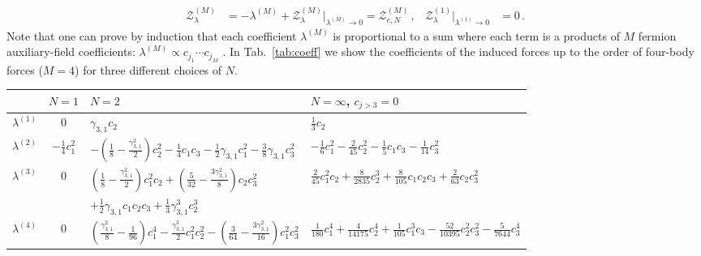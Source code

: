 \documentclass[aps,prl,twocolumn,showpacs,superscriptaddress,groupedaddress, final, nofootinbib]{revtex4}  %
\newcommand{\Z}{\ensuremath{\mathcal{Z}}}
\newcommand{\g}{\ensuremath{\gamma}}
\newcommand{\oneby}[1]{\frac{1}{#1}}
\begin{document}
{\small
\begin{align}
	\Z^{(M)}_{\lambda}
	&=
	-\lambda^{(M)} 
	+
	\Z^{(M)}_{\lambda}\big|_{\lambda^{(M)}\to 0}
	=
	\Z^{(M)}_{c,N}
	\, ,
	&
	\Z^{(1)}_{\lambda}\big|_{\lambda^{(1)}\to 0}
	&=
	0
	\, .
\end{align}}
Note that one can prove by induction that each coefficient $\lambda^{(M)}$ is proportional to a sum where each term is a products of $M$ fermion auxiliary-field coefficients: $\lambda^{(M)} \propto c_{j_1} \cdots c_{j_M}$ \cite{our-long-paper}.
In Tab.~\ref{tab:coeff} we show the coefficients of the induced forces up to the order of four-body forces ($M=4$) for three different choices of $N$.

\begin{table}
    \begin{center}
{\small
    \begin{tabular}{|c|c|p{}|p{}|}
        \hline
                        &   $N=1$               &   $N=2$   
                                    &   $N=\infty$, $c_{j>3}=0$
                        \\\hline\hline
        $\lambda^{(1)}$ &   $0$                 &   $\g_{3,1} c_2$
                                    &   $\frac{1}{3}c_2$
                        \\\hline
        $\lambda^{(2)}$ &   $-\frac{1}{4}c_1^2$ &   $-\left(\oneby{8}-\frac{\g_{3,1}^2}{2}\right)c_2^2-\oneby{4}c_1c_3-\oneby{2}\g_{3,1}c_1^2-\frac{3}{8} \g_{3,1} c_3^2$
                                    &   $-\oneby{6}c_1^2 - \frac{2}{45}c_2^2 - \oneby{5} c_1 c_3 - \oneby{14}c_3^2$
                        \\\hline
        $\lambda^{(3)}$ &   $0$                 &   $\left(\oneby{8} - \frac{\g_{3,1}^2}{2}\right)c_1^2c_2 + \left(\frac{5}{32} - \frac{3\g_{3,1}^2}{8}\right) c_2c_3^2$
                                    &   $\frac{2}{45}c_1^2c_2 + \frac{8}{2835}c_2^3 + \frac{8}{105} c_1c_2c_3 + \frac{2}{63}c_2c_3^2$
                        \\
                        &                       &   $+ \oneby{2} \g_{3,1}c_1c_2c_3 + \oneby{3}\g_{3,1}^3c_2^3$
                                    &
                        \\\hline
        $\lambda^{(4)}$ &   $0$                 &   $\left(\frac{\g_{3,1}^2}{8}-\oneby{96}\right)c_1^4 - \frac{\g_{3,1}^3}{2}c_1^2c_2^2 - \left(\frac{3}{64}-\frac{3\g_{3,1}^2}{16}\right)c_1^2c_3^2$
                                    &   $\oneby{180}c_1^4 + \frac{4}{14 175}c_2^4 + \oneby{105}c_1^3c_3 - \frac{52}{10 395} c_2^2 c_3^2 - \frac{5}{7644} c_3^4$

\end{tabular}}
\end{center}
\end{table}
\end{document}
